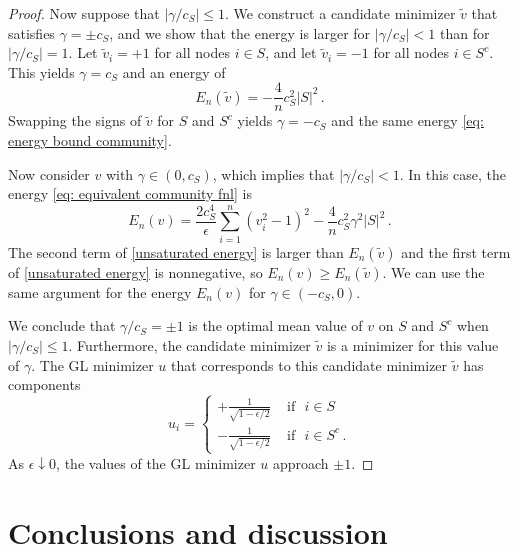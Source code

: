 \documentclass[11pt]{amsart}
\def\ep{\epsilon}
\numberwithin{equation}{section}
\begin{document}
\begin{proof}
Now suppose that $\left|{\gamma}/{c_S}\right| \leq 1$. We construct a candidate minimizer $\tilde{v}$ that satisfies $\gamma = \pm c_S$, and we show that the energy is larger for {$|\gamma/c_S| < 1$ than for $|\gamma/c_S| = 1$.} 
Let $\tilde{v}_i = +1$ for all nodes $i \in S$, and let $\tilde{v}_i = -1$ for all nodes $i \in S^c$. This yields $\gamma = c_S$ and an energy of
\begin{equation} \label{eq: energy bound community}
    E_n(\tilde{v}) = - \frac{4}{n} c_S^2 |S|^2 \,.
\end{equation}
Swapping the signs of $\tilde{v}$ for $S$ and $S^c$ yields $\gamma = -c_S$ and the {same energy \eqref{eq: energy bound community}}. 

Now consider $v$ with $\gamma \in (0, c_S)$, which implies that $|\gamma/c_S| < 1$. {In this case, the energy \eqref{eq: equivalent community fnl} is}
\begin{equation}\label{unsaturated energy}
    E_n(v) =  \frac{2c_S^4}{\ep} \sum_{i = 1}^n (v_i^2 - 1)^2  - \frac{4}{n} c_S^2 \gamma^2 |S|^2 \,.
\end{equation} 
The second term of \eqref{unsaturated energy} is larger than $E_n(\tilde{v})$ and the first term of \eqref{unsaturated energy} is nonnegative, so $E_n(v) \geq E_n(\tilde{v})$. 
We can use the same argument for the energy $E_n(v)$ for $\gamma \in (-c_S, 0)$. 

We conclude that ${\gamma}/{c_S} = \pm 1$ is the optimal mean value of $v$ on $S$ and $S^c$ when $\left|{\gamma}/{c_S}\right| \leq 1$. Furthermore, the candidate minimizer $\tilde{v}$ is {a} minimizer for this value of $\gamma$. 
The GL minimizer $u$ {that corresponds to this candidate minimizer $\tilde{v}$} has components
\begin{equation}
    u_i = \begin{cases}
        +\frac{1}{\sqrt{1 - \ep/2}} &\text{ if }\,\, i\in S 
        \\
        -\frac{1}{\sqrt{1 - \ep/2}} &\text{ if } \,\, i\in S^c \,. 
    \end{cases}
\end{equation}
{As $\ep \downarrow 0$, the values of the {GL} minimizer $u$ approach $\pm 1$.}

\end{proof}


\section{Conclusions and discussion} \label{sec: conclusion}
\end{document}
